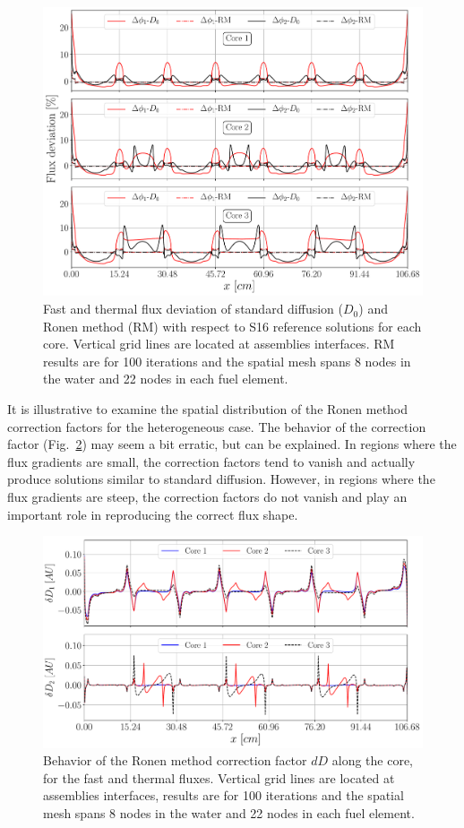 \begin{figure}[htbp!]
	\centering
	\includegraphics[width=0.75\linewidth]{flx_err_diff_C123.pdf}
	\caption{Fast and thermal flux deviation of standard diffusion ($D_0$) and Ronen method (RM) with respect to S16 reference solutions for each core. Vertical grid lines are located at assemblies interfaces. RM results are for 100 iterations and the spatial mesh spans 8 nodes in the water and 22 nodes in each fuel element.}
	\label{fig:hetero-flux-dev}
\end{figure}

It is illustrative to examine the spatial distribution of the Ronen method correction factors for the heterogeneous case. The behavior of the correction factor (Fig.~\ref{fig:Dcoef}) may seem a bit erratic, but can be explained. In regions where the flux gradients are small, the correction factors tend to vanish and actually produce solutions similar to standard diffusion. However, in regions where the flux gradients are steep, the correction factors do not vanish and play an important role in reproducing the correct flux shape.

\begin{figure}[htbp!]
	\centering
	\includegraphics[width=0.75\linewidth]{RM_dD_100it_8_22_728_C123.pdf}
	\caption{Behavior of the Ronen method correction factor $dD$ along the core, for the fast and thermal fluxes. Vertical grid lines are located at assemblies interfaces, results are for 100 iterations and the spatial mesh spans 8 nodes in the water and 22 nodes in each fuel element.}
	\label{fig:Dcoef}
\end{figure}






